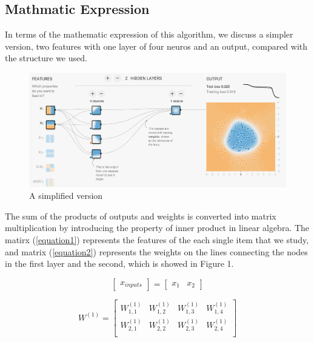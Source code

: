 \documentclass{article}
\begin{document}
\begin{spacing}{2}
    \section{Mathmatic Expression}

    In terms of the mathematic expression of this algorithm, we discuss a simpler version, two features with one layer of four neuros and an output, compared with the structure we used.\\

    \begin{figure}[H]
        \centering 
        \includegraphics[width=1\textwidth]{TF_Playground}
        \caption{A simplified version\cite{TF_Playground}}
        \end{figure} 
        
    \noindent The sum of the products of outputs and weights is converted into matrix multiplication by introducing the property of inner product in linear algebra. The matirx (\ref{equation1}) represents the features of the each single item that we study, and matrix (\ref{equation2}) represents the weights on the lines connecting the nodes in the first layer and the second, which is showed in Figure 1.

    \begin{equation}\label{equation1}
        {\left[ \begin{array}{c}
            x_{inputs}
            \end{array}\right]}=
        {\left[ \begin{array}{cc}
        x_1 & x_2
        \end{array}\right]}
    \end{equation}

    \begin{equation}\label{equation2}
        W^{(1)}=
        {\left[ \begin{array}{cccc}
        W^{(1)}_{1,1} & W^{(1)}_{1,2} & W^{(1)}_{1,3} & W^{(1)}_{1,4}\\
        W^{(1)}_{2,1} & W^{(1)}_{2,2} & W^{(1)}_{2,3} & W^{(1)}_{2,4}\\
        \end{array}\right]}
    \end{equation}\\


\end{spacing}
\end{document}
